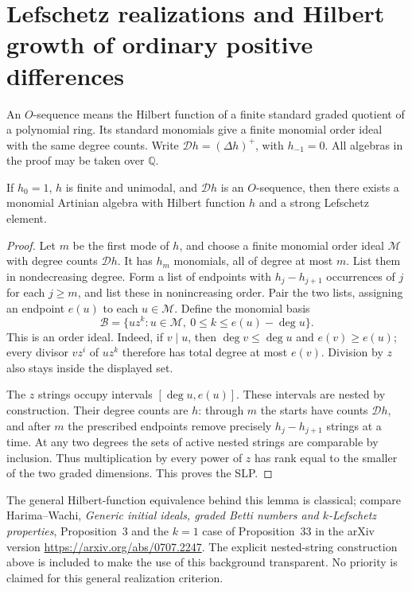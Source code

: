 \section{Lefschetz realizations and Hilbert growth of ordinary positive differences}
An $O$-sequence means the Hilbert function of a finite standard
graded quotient of a polynomial ring. Its standard monomials
give a finite monomial order ideal with the same degree counts.
Write $\mathcal D h=(\Delta h)^+$, with $h_{-1}=0$.
All algebras in the proof may be taken over $\mathbb Q$.

\begin{lemma}
If $h_0=1$, $h$ is finite and unimodal, and $\mathcal D h$
is an $O$-sequence, then there exists a monomial Artinian
algebra with Hilbert function $h$ and a strong Lefschetz element.
\end{lemma}
\begin{proof}
Let $m$ be the first mode of $h$, and choose a finite monomial
order ideal $\mathcal M$ with degree counts $\mathcal D h$.
It has $h_m$ monomials, all of degree at most $m$.
List them in nondecreasing degree. Form a list of endpoints
with $h_j-h_{j+1}$ occurrences of $j$ for each $j\ge m$,
and list these in nonincreasing order. Pair the two lists,
assigning an endpoint $e(u)$ to each $u\in\mathcal M$.
Define the monomial basis
\[
 \mathcal B=\{u z^k:u\in\mathcal M,\ 0\le k\le e(u)-\deg u\}.
\]
This is an order ideal. Indeed, if $v\mid u$, then
$\deg v\le\deg u$ and $e(v)\ge e(u)$; every divisor
$v z^i$ of $u z^k$ therefore has total degree at most $e(v)$.
Division by $z$ also stays inside the displayed set.

The $z$ strings occupy intervals $[\deg u,e(u)]$. These
intervals are nested by construction. Their degree counts are
$h$: through $m$ the starts have counts $\mathcal D h$,
and after $m$ the prescribed endpoints remove precisely
$h_j-h_{j+1}$ strings at a time. At any two degrees the sets
of active nested strings are comparable by inclusion. Thus
multiplication by every power of $z$ has rank equal to the
smaller of the two graded dimensions. This proves the SLP.
\end{proof}

The general Hilbert-function equivalence behind this lemma is
classical; compare Harima--Wachi,
\emph{Generic initial ideals, graded Betti numbers and
$k$-Lefschetz properties}, Proposition~3 and the $k=1$ case
of Proposition~33 in the arXiv version
\url{https://arxiv.org/abs/0707.2247}.
The explicit nested-string construction above is included to
make the use of this background transparent. No priority is
claimed for this general realization criterion.


